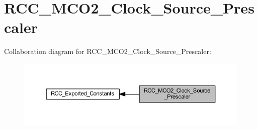 \hypertarget{group___r_c_c___m_c_o2___clock___source___prescaler}{}\section{R\+C\+C\+\_\+\+M\+C\+O2\+\_\+\+Clock\+\_\+\+Source\+\_\+\+Prescaler}
\label{group___r_c_c___m_c_o2___clock___source___prescaler}
Collaboration diagram for R\+C\+C\+\_\+\+M\+C\+O2\+\_\+\+Clock\+\_\+\+Source\+\_\+\+Prescaler\+:
\nopagebreak
\begin{figure}[H]
\begin{center}
\leavevmode
\includegraphics[width=350pt]{group___r_c_c___m_c_o2___clock___source___prescaler}
\end{center}
\end{figure}
